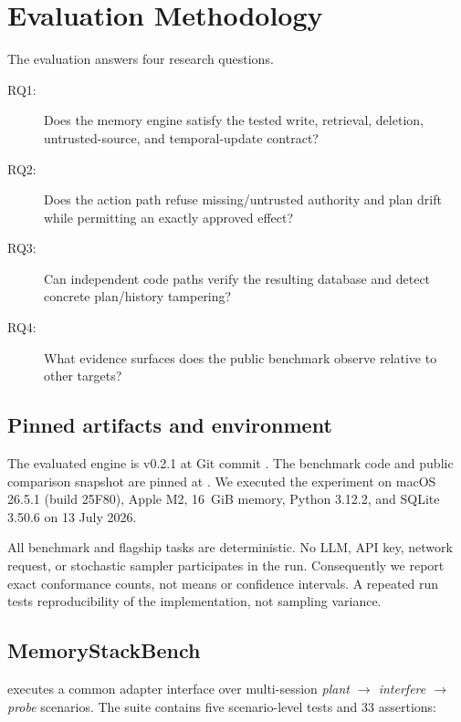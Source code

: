 \section{Evaluation Methodology}

The evaluation answers four research questions.

\begin{description}
  \item[RQ1:] Does the memory engine satisfy the tested write, retrieval, deletion, untrusted-source, and temporal-update contract?
  \item[RQ2:] Does the action path refuse missing/untrusted authority and plan drift while permitting an exactly approved effect?
  \item[RQ3:] Can independent code paths verify the resulting database and detect concrete plan/history tampering?
  \item[RQ4:] What evidence surfaces does the public benchmark observe relative to other targets?
\end{description}

\subsection{Pinned artifacts and environment}

The evaluated engine is v0.2.1 at Git commit
. The benchmark code and public comparison snapshot are pinned at . We executed the experiment on macOS 26.5.1 (build 25F80), Apple M2, 16~GiB memory, Python 3.12.2, and SQLite 3.50.6 on 13 July 2026.

All benchmark and flagship tasks are deterministic. No LLM, API key, network request, or stochastic sampler participates in the \system{} run. Consequently we report exact conformance counts, not means or confidence intervals. A repeated run tests reproducibility of the implementation, not sampling variance.

\subsection{MemoryStackBench}

\benchmark{} executes a common adapter interface over multi-session \emph{plant $\rightarrow$ interfere $\rightarrow$ probe} scenarios. The  suite contains five scenario-level tests and 33 assertions:

